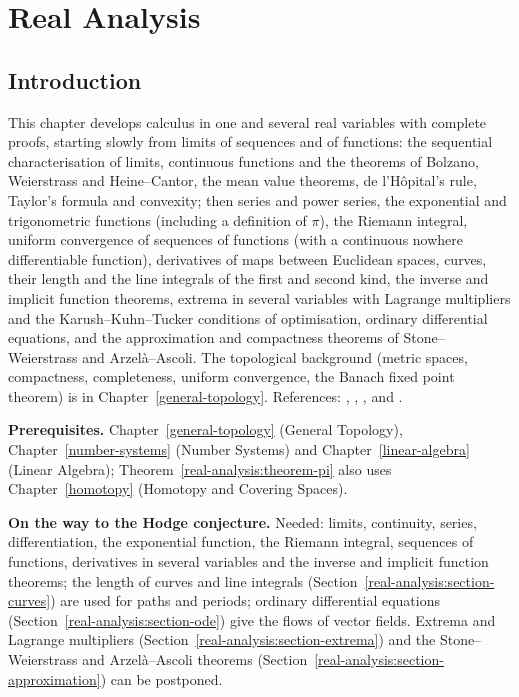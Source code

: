 \chapter{Real Analysis}\label{real-analysis}

\section{Introduction}\label{real-analysis:section-introduction}

This chapter develops calculus in one and several real variables with complete proofs, starting slowly from limits of sequences and of functions: the sequential characterisation of limits,
continuous functions and the theorems of Bolzano, Weierstrass and Heine--Cantor, the mean value theorems, de l'H\^opital's rule, Taylor's formula and convexity;
then series and power series, the exponential
and trigonometric functions (including a definition of $\pi$), the Riemann integral, uniform convergence of sequences of functions (with a continuous nowhere differentiable function), derivatives of maps between Euclidean spaces, curves, their length and the line integrals of the first and second kind,
the inverse and implicit function theorems, extrema in several variables with Lagrange multipliers and the Karush--Kuhn--Tucker conditions of optimisation, ordinary differential equations, and the approximation and compactness theorems of
Stone--Weierstrass and Arzel\`a--Ascoli. The topological background (metric spaces, compactness, completeness, uniform convergence,
the Banach fixed point theorem) is in Chapter~\ref{general-topology}. References: \cite{rudin-principles}, \cite{dieudonne-foundations},
\cite{spivak-calculus-manifolds}, \cite{lang-real-functional} and \cite{hartman-ode}.

\noindent\textbf{Prerequisites.} Chapter~\ref{general-topology} (General Topology), Chapter~\ref{number-systems} (Number Systems) and
Chapter~\ref{linear-algebra} (Linear Algebra); Theorem~\ref{real-analysis:theorem-pi} also uses Chapter~\ref{homotopy} (Homotopy and Covering Spaces).

\noindent\textbf{On the way to the Hodge conjecture.} Needed: limits, continuity, series, differentiation, the exponential function, the Riemann integral, sequences of functions, derivatives in
several variables and the inverse and implicit function theorems; the length of curves and line integrals (Section~\ref{real-analysis:section-curves}) are used for paths and periods; ordinary differential equations (Section~\ref{real-analysis:section-ode}) give the flows of vector fields. Extrema and Lagrange multipliers
(Section~\ref{real-analysis:section-extrema}) and the Stone--Weierstrass and Arzel\`a--Ascoli theorems (Section~\ref{real-analysis:section-approximation}) can be postponed.

